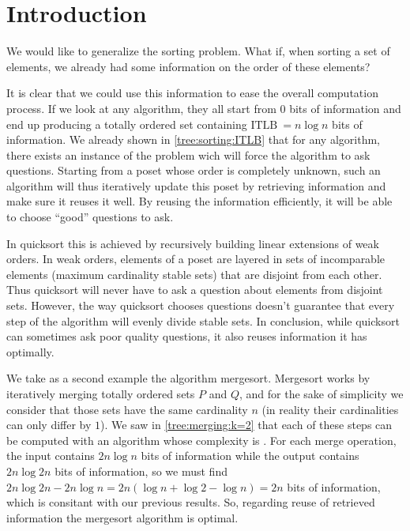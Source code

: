 \section{Introduction}


We would like to generalize the sorting problem. What if, when sorting a set of
elements, we already had some information on the order of these elements?


It is clear that we could use this information to ease the overall computation
process. If we look at any  algorithm, they all start from
$0$ bits of information and end up producing a totally ordered set containing
$\text{ITLB}~= n \log n$ bits of information. We already shown in
\ref{tree:sorting:ITLB} that for any algorithm, there exists an instance of the
problem wich will force the algorithm to ask  questions.
Starting from a poset whose order is completely unknown, such an algorithm will
thus iteratively update this poset by retrieving information and make sure it
reuses it well. By reusing the information efficiently, it will be able to
choose ``good'' questions to ask.


In quicksort this is achieved by recursively building linear extensions of weak
orders. In weak orders, elements of a poset are layered in sets of incomparable
elements (maximum cardinality stable sets) that are disjoint from each other.
Thus quicksort will never have to ask a question about elements from disjoint
sets. However, the way quicksort chooses questions doesn't guarantee that every
step of the algorithm will evenly divide stable sets. In conclusion, while
quicksort can sometimes ask poor quality questions, it also reuses information
it has optimally.


We take as a second example the algorithm mergesort. Mergesort works by
iteratively merging totally ordered sets $P$ and $Q$, and for the sake of
simplicity we consider that those sets have the same cardinality $n$  (in
reality their cardinalities can only differ by $1$). We saw in
\ref{tree:merging:k=2} that each of these steps can be computed with an
algorithm whose complexity is . For each merge operation, the input
contains $2n \log n$ bits of information while the output contains $2n \log 2n$
bits of information, so we must find $2n \log 2n - 2n \log n = 2n (\log n +
\log 2 - \log n) = 2n$ bits of information, which is consitant with our
previous results. So, regarding reuse of retrieved information the mergesort
algorithm is optimal.

